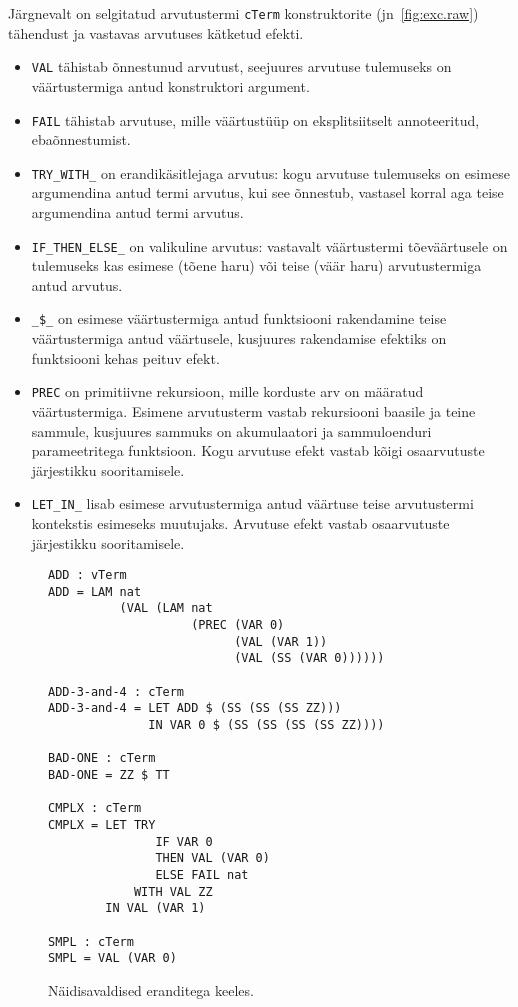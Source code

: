 \documentclass[a4paper,12pt]{article}
\begin{document}
Järgnevalt on selgitatud arvutustermi {\tt cTerm} konstruktorite (jn~\ref{fig:exc.raw}) tähendust ja vastavas arvutuses kätketud efekti.
\begin{itemize}
\item {\tt VAL} tähistab õnnestunud arvutust, seejuures arvutuse tulemuseks on väärtustermiga antud konstruktori argument.
\item {\tt FAIL} tähistab arvutuse, mille väärtustüüp on eksplitsiitselt annoteeritud, ebaõnnestumist.
\item {\tt TRY_WITH_} on erandikäsitlejaga arvutus: kogu arvutuse tulemuseks on esimese argumendina antud termi arvutus, kui see õnnestub, vastasel korral aga teise argumendina antud termi arvutus.
\item {\tt IF_THEN_ELSE_} on valikuline arvutus: vastavalt väärtustermi tõeväärtusele on tulemuseks kas esimese (tõene haru) või teise (väär haru) arvutustermiga antud arvutus.
\item {\tt _\$_} on esimese väärtustermiga antud funktsiooni rakendamine teise väärtustermiga antud väärtusele, kusjuures rakendamise efektiks on funktsiooni kehas peituv efekt.
\item {\tt PREC} on primitiivne rekursioon, mille korduste arv on määratud väärtustermiga. Esimene arvutusterm vastab rekursiooni baasile ja teine sammule, kusjuures sammuks on akumulaatori ja sammuloenduri parameetritega funktsioon. Kogu arvutuse efekt vastab kõigi osaarvutuste järjestikku sooritamisele.
\item {\tt LET_IN_} lisab esimese arvutustermiga antud väärtuse teise arvutustermi kontekstis esimeseks muutujaks. Arvutuse efekt vastab osaarvutuste järjestikku sooritamisele.
\end{itemize}

\begin{figure}
  \begin{BVerbatim}
ADD : vTerm
ADD = LAM nat
          (VAL (LAM nat
                    (PREC (VAR 0)
                          (VAL (VAR 1))
                          (VAL (SS (VAR 0))))))

ADD-3-and-4 : cTerm
ADD-3-and-4 = LET ADD $ (SS (SS (SS ZZ)))
              IN VAR 0 $ (SS (SS (SS (SS ZZ))))

BAD-ONE : cTerm
BAD-ONE = ZZ $ TT

CMPLX : cTerm
CMPLX = LET TRY
               IF VAR 0
               THEN VAL (VAR 0)
               ELSE FAIL nat
            WITH VAL ZZ
        IN VAL (VAR 1)

SMPL : cTerm
SMPL = VAL (VAR 0)
  \end{BVerbatim}
  \caption{Näidisavaldised eranditega keeles.}
  \label{fig:exc.raw.ex1}
\end{figure}
\end{document}
